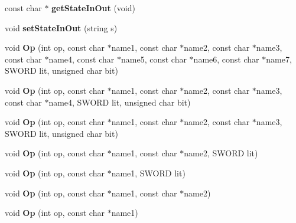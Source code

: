 \begin{DoxyCompactItemize}
\item 
\hypertarget{class_int_code_aadc8d6bef327519db6e730ddb2258182}{const char $\ast$ {\bfseries get\-State\-In\-Out} (void)}\label{class_int_code_aadc8d6bef327519db6e730ddb2258182}

\item 
\hypertarget{class_int_code_a3e32666b47ffa3de4235d95bd0ec608c}{void {\bfseries set\-State\-In\-Out} (string s)}\label{class_int_code_a3e32666b47ffa3de4235d95bd0ec608c}

\item 
\hypertarget{class_int_code_a329460a4f2ed5b072d5914d117eec67e}{void {\bfseries Op} (int op, const char $\ast$name1, const char $\ast$name2, const char $\ast$name3, const char $\ast$name4, const char $\ast$name5, const char $\ast$name6, const char $\ast$name7, S\-W\-O\-R\-D lit, unsigned char bit)}\label{class_int_code_a329460a4f2ed5b072d5914d117eec67e}

\item 
\hypertarget{class_int_code_ae3abaf8cc0ff9cc4c845a853c14e23f9}{void {\bfseries Op} (int op, const char $\ast$name1, const char $\ast$name2, const char $\ast$name3, const char $\ast$name4, S\-W\-O\-R\-D lit, unsigned char bit)}\label{class_int_code_ae3abaf8cc0ff9cc4c845a853c14e23f9}

\item 
\hypertarget{class_int_code_a1821d60d6d20742a430d086dde8f2833}{void {\bfseries Op} (int op, const char $\ast$name1, const char $\ast$name2, const char $\ast$name3, S\-W\-O\-R\-D lit, unsigned char bit)}\label{class_int_code_a1821d60d6d20742a430d086dde8f2833}

\item 
\hypertarget{class_int_code_a8644934876d977adde6e87c5c6f86206}{void {\bfseries Op} (int op, const char $\ast$name1, const char $\ast$name2, S\-W\-O\-R\-D lit)}\label{class_int_code_a8644934876d977adde6e87c5c6f86206}

\item 
\hypertarget{class_int_code_aff9baee761e162b15a2dd77d92c18b7b}{void {\bfseries Op} (int op, const char $\ast$name1, S\-W\-O\-R\-D lit)}\label{class_int_code_aff9baee761e162b15a2dd77d92c18b7b}

\item 
\hypertarget{class_int_code_abf95939f2a54c9dd874fbc03e23d48e8}{void {\bfseries Op} (int op, const char $\ast$name1, const char $\ast$name2)}\label{class_int_code_abf95939f2a54c9dd874fbc03e23d48e8}

\item 
\hypertarget{class_int_code_ae0db8fcdbbf5df8443fdcd68295a7bb4}{void {\bfseries Op} (int op, const char $\ast$name1)}\label{class_int_code_ae0db8fcdbbf5df8443fdcd68295a7bb4}


\end{DoxyCompactItemize}
